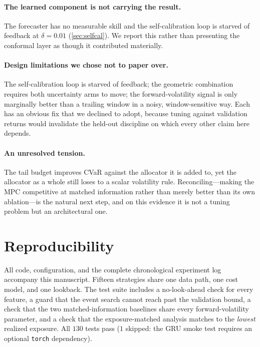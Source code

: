 \documentclass[journal]{IEEEtran}
\begin{document}
\paragraph{The learned component is not carrying the result.} The forecaster has
no measurable skill and the self-calibration loop is starved of feedback at
$\delta=0.01$ (\cref{sec:selfcal}). We report this rather than presenting the
conformal layer as though it contributed materially.

\paragraph{Design limitations we chose not to paper over.} The self-calibration
loop is starved of feedback; the geometric combination requires both uncertainty
arms to move; the forward-volatility signal is only marginally better than a
trailing window in a noisy, window-sensitive way. Each has an obvious fix that we
declined to adopt, because tuning against validation returns would invalidate the
held-out discipline on which every other claim here depends.

\paragraph{An unresolved tension.} The tail budget improves CVaR against the
allocator it is added to, yet the allocator as a whole still loses to a scalar
volatility rule. Reconciling---making the MPC competitive at matched information
rather than merely better than its own ablation---is the natural next step, and on
this evidence it is not a tuning problem but an architectural one.

\section{Reproducibility}
\label{sec:repro}

All code, configuration, and the complete chronological experiment log accompany
this manuscript. Fifteen strategies share one data path, one cost model, and one
lookback. The test suite includes a no-look-ahead check for every feature, a guard
that the event search cannot reach past the validation bound, a check that the two
matched-information baselines share every forward-volatility parameter, and a check
that the exposure-matched analysis matches to the \emph{lowest} realized exposure.
All $130$ tests pass ($1$ skipped: the GRU smoke test requires an optional
\texttt{torch} dependency).
\end{document}
